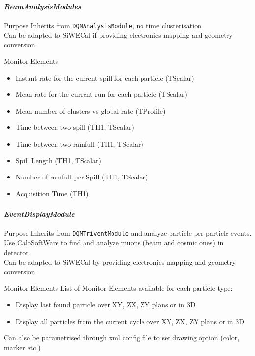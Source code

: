\documentclass[8pt]{beamer}
\begin{document}
  \begin{frame}[containsverbatim]
  \frametitle{\secname}
  \framesubtitle{\textit{BeamAnalysisModules}}


    \begin{block}{Purpose}
      Inherits from \verb|DQMAnalysisModule|, no time clusterisation \\
      Can be adapted to SiWECal if providing electronics mapping and geometry conversion.
    \end{block}

    \begin{block}{Monitor Elements}
    \begin{itemize}
        \item Instant rate for the current spill for each particle (TScalar)
        \item Mean rate for the current run for each particle (TScalar)
        \item Mean number of clusters vs global rate (TProfile)
        \item Time between two spill (TH1, TScalar)
        \item Time between two ramfull (TH1, TScalar)
        \item Spill Length (TH1, TScalar)
        \item Number of ramfull per Spill (TH1, TScalar)
        \item Acquisition Time (TH1)
      \end{itemize}
\end{block}
  \end{frame}


  \begin{frame}[containsverbatim]
  \frametitle{\secname}
  \framesubtitle{\textit{EventDisplayModule}}

    \begin{block}{Purpose}
      Inherits from \verb|DQMTriventModule| and analyze particle per particle events. \\
      Use CaloSoftWare to find and analyze muons (beam and cosmic ones) in detector. \\
      Can be adapted to SiWECal by providing electronics mapping and geometry conversion.
    \end{block}

    \begin{block}{Monitor Elements}
    List of Monitor Elements available for each particle type:
      \begin{itemize}
        \item Display last found particle over XY, ZX, ZY plans or in 3D
        \item Display all particles from the current cycle over XY, ZX, ZY plans or in 3D
      \end{itemize}

    Can also be parametrised through xml config file to set drawing option (color, marker etc.)
        \end{block}

  \end{frame}
\end{document}
